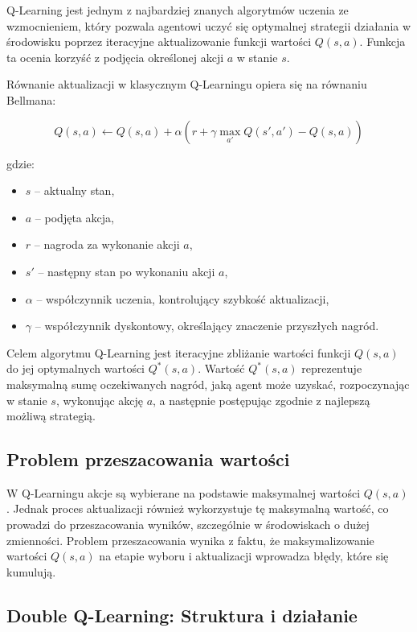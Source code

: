 Q-Learning jest jednym z najbardziej znanych algorytmów uczenia ze wzmocnieniem, który pozwala agentowi uczyć się optymalnej strategii działania w środowisku poprzez iteracyjne aktualizowanie funkcji wartości \(Q(s, a)\). Funkcja ta ocenia korzyść z podjęcia określonej akcji \(a\) w stanie \(s\).

Równanie aktualizacji w klasycznym Q-Learningu opiera się na równaniu Bellmana:

\begin{equation}Q(s, a) \leftarrow Q(s, a) + \alpha \left( r + \gamma \max_{a'} Q(s', a') - Q(s, a) \right)\end{equation}

gdzie:
\begin{itemize}
	\item \(s\) – aktualny stan,
	\item \(a\) – podjęta akcja,
	\item \(r\) – nagroda za wykonanie akcji \(a\),
	\item \(s'\) – następny stan po wykonaniu akcji \(a\),
	\item \(\alpha\) – współczynnik uczenia, kontrolujący szybkość aktualizacji,
	\item \(\gamma\) – współczynnik dyskontowy, określający znaczenie przyszłych nagród.
\end{itemize}

Celem algorytmu Q-Learning jest iteracyjne zbliżanie wartości funkcji \(Q(s, a)\) do jej optymalnych wartości \(Q^*(s, a)\). Wartość \(Q^*(s, a)\) reprezentuje maksymalną sumę oczekiwanych nagród, jaką agent może uzyskać, rozpoczynając w stanie \(s\), wykonując akcję \(a\), a następnie postępując zgodnie z najlepszą możliwą strategią.

\subsection{Problem przeszacowania wartości}

W Q-Learningu akcje są wybierane na podstawie maksymalnej wartości \(Q(s, a)\). Jednak proces aktualizacji również wykorzystuje tę maksymalną wartość, co prowadzi do przeszacowania wyników, szczególnie w środowiskach o dużej zmienności. Problem przeszacowania wynika z faktu, że maksymalizowanie wartości \(Q(s, a)\) na etapie wyboru i aktualizacji wprowadza błędy, które się kumulują.

\subsection{Double Q-Learning: Struktura i działanie}

